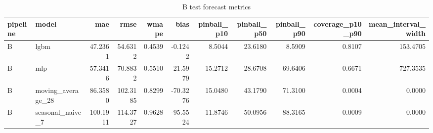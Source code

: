 \begin{table}
\caption{B test forecast metrics}
\label{tab:metrics-B}
\begin{tabular}{llrrrrrrrrr}
\toprule
pipeline & model & mae & rmse & wmape & bias & pinball\_p10 & pinball\_p50 & pinball\_p90 & coverage\_p10\_p90 & mean\_interval\_width \\
\midrule
B & lgbm & 47.2361 & 54.6312 & 0.4539 & -0.1242 & 8.5044 & 23.6180 & 8.5909 & 0.8107 & 153.4705 \\
B & mlp & 57.3416 & 70.8832 & 0.5510 & 21.5979 & 15.2712 & 28.6708 & 69.6406 & 0.6671 & 727.3535 \\
B & moving\_average\_28 & 86.3580 & 102.3185 & 0.8299 & -70.3276 & 15.0480 & 43.1790 & 71.3100 & 0.0004 & 0.0000 \\
B & seasonal\_naive\_7 & 100.1911 & 114.3727 & 0.9628 & -95.5524 & 11.8746 & 50.0956 & 88.3165 & 0.0009 & 0.0000 \\
\bottomrule
\end{tabular}
\end{table}
